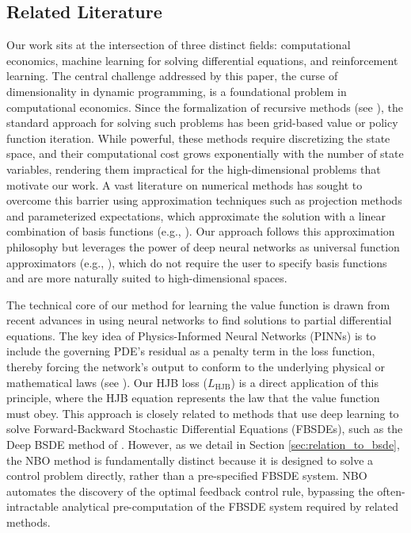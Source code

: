\documentclass[ecta]{econsocart}
\theoremstyle{plain}
\theoremstyle{remark}
\begin{document}
\subsection{Related Literature}
Our work sits at the intersection of three distinct fields: computational economics, machine learning for solving differential equations, and reinforcement learning. The central challenge addressed by this paper, the curse of dimensionality in dynamic programming, is a foundational problem in computational economics. Since the formalization of recursive methods (see \cite{stokey1989recursive}), the standard approach for solving such problems has been grid-based value or policy function iteration. While powerful, these methods require discretizing the state space, and their computational cost grows exponentially with the number of state variables, rendering them impractical for the high-dimensional problems that motivate our work. A vast literature on numerical methods has sought to overcome this barrier using approximation techniques such as projection methods and parameterized expectations, which approximate the solution with a linear combination of basis functions (e.g., \cite{judd1998numerical}). Our approach follows this approximation philosophy but leverages the power of deep neural networks as universal function approximators (e.g., \cite{hornik1989multilayer,qian2025icml}), which do not require the user to specify basis functions and are more naturally suited to high-dimensional spaces.

\begin{sloppypar}
The technical core of our method for learning the value function is drawn from recent advances in using neural networks to find solutions to partial differential equations. The key idea of Physics-Informed Neural Networks (PINNs) is to include the governing PDE's residual as a penalty term in the loss function, thereby forcing the network's output to conform to the underlying physical or mathematical laws (see \cite{raissi2019physics}). Our HJB loss ($L_{\text{HJB}}$) is a direct application of this principle, where the HJB equation represents the law that the value function must obey. This approach is closely related to methods that use deep learning to solve Forward-Backward Stochastic Differential Equations (FBSDEs), such as the Deep BSDE method of \cite{han2018solving}. However, as we detail in Section \ref{sec:relation_to_bsde}, the NBO method is fundamentally distinct because it is designed to solve a control problem directly, rather than a pre-specified FBSDE system. NBO automates the discovery of the optimal feedback control rule, bypassing the often-intractable analytical pre-computation of the FBSDE system required by related methods.
\end{sloppypar}
\end{document}
